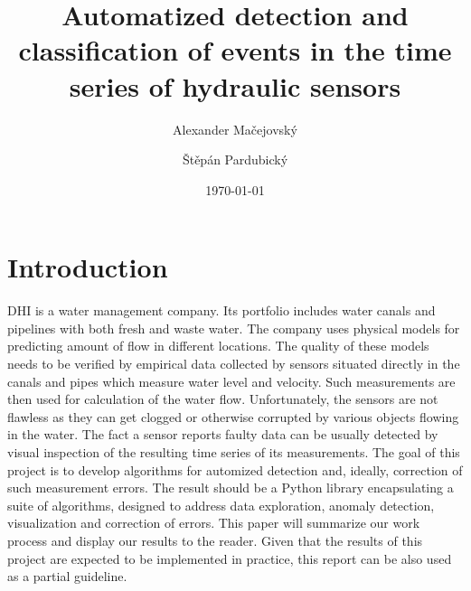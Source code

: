\documentclass[12pt,a4paper]{article}
\title{Automatized detection and classification of events in the time series of hydraulic sensors}
\author{Alexander Ma\v{c}ejovsk\'{y} \and \v{S}t\v{e}p\'{a}n Pardubick\'{y}}
\date{\today}
\begin{document}

\maketitle %

\thispagestyle{empty} %

\clearpage %

\tableofcontents  


\newpage

\section{Introduction}

DHI is a water management company. Its portfolio includes water canals and pipelines with both fresh and waste water. The company uses physical models for predicting amount of flow in different locations. The quality of these models needs to be verified by empirical data collected by sensors situated directly in the canals and pipes which measure water level and velocity. Such measurements are then used for calculation of the water flow. Unfortunately, the sensors are not flawless as they can get clogged or otherwise corrupted by various objects flowing in the water. The fact a sensor reports faulty data can be usually detected by visual inspection of the resulting time series of its measurements. The goal of this project is to develop algorithms for automized detection and, ideally, correction of such measurement errors. The result should be a Python library encapsulating a suite of algorithms, designed to address data exploration, anomaly detection, visualization and correction of errors. This paper will summarize our work process and display our results to the reader. Given that the results of this project are expected to be implemented in practice, this report can be also used as a partial guideline.
\end{document}
